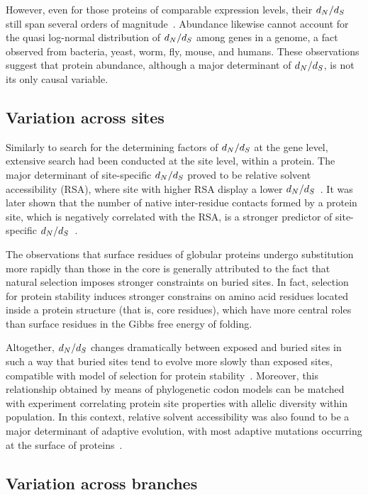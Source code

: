 However, even for those proteins of comparable expression levels, their $d_N / d_S$ still span several orders of magnitude~\citep{Drummond2008}.
Abundance likewise cannot account for the quasi log-normal distribution of $d_N / d_S$ among genes in a genome, a fact observed from bacteria, yeast, worm, fly, mouse, and humans.
These observations suggest that protein abundance, although a major determinant of $d_N / d_S$, is not its only causal variable.

\subsection{Variation across sites}

Similarly to search for the determining factors of $d_N / d_S$ at the gene level, extensive search had been conducted at the site level, within a protein.
The major determinant of site-specific $d_N / d_S$ proved to be relative solvent accessibility (RSA), where site with higher RSA display a lower $d_N / d_S$~\citep{Ramsey2011}.
It was later shown that the number of native inter-residue contacts formed by a protein site, which is negatively correlated with the RSA, is a stronger predictor of site-specific $d_N / d_S$~\citep{Yeh2013}.

The observations that surface residues of globular proteins undergo \gls{substitution} more rapidly than those in the core is generally attributed to the fact that natural selection imposes stronger constraints on buried sites.
In fact, selection for protein stability induces stronger constrains on amino acid residues located inside a protein structure (that is, core residues), which have more central roles than surface residues in the Gibbs free energy of folding.

Altogether, $d_N / d_S$ changes dramatically between exposed and buried sites in such a way that buried sites tend to evolve more slowly than exposed sites, compatible with model of selection for protein stability~\citep{Echave2016}.
Moreover, this relationship obtained by means of phylogenetic \gls{codon} models can be matched with experiment correlating protein site properties with allelic diversity within population.
In this context, relative solvent accessibility was also found to be a major determinant of adaptive evolution, with most adaptive mutations occurring at the surface of proteins~\citep{Moutinho2019}.

\subsection{Variation across branches}

